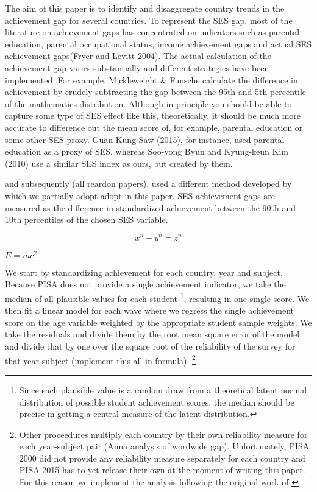 \documentclass[11pt, a4paper]{article}\usepackage[]{graphicx}\usepackage[]{color}
\begin{document}
The aim of this paper is to identify and disaggregate country trends in the achievement gap for several countries. To represent the SES gap, most of the literature on achievement gaps has concentrated on indicators such as parental education, parental occupational status, income achievement gaps and actual SES achievement gaps(Fryer and Levitt 2004). The actual calculation of the achievement gap varies substantially and different strategies have been implemented. For example, Mickleweight \& Funsche calculate the difference in achievement by crudely subtracting the gap between the 95th and 5th percentile of the mathematics distribution. Although in principle you should be able to capture some type of SES effect like this, theoretically, it should be much more accurate to difference out the mean score of, for example, parental education or some other SES proxy. Guan Kung Saw (2015), for instance, used parental education as a proxy of SES, whereas Soo-yong Byun and Kyung-keun Kim (2010) use a similar SES index as ours, but created by them.

\citet{reardon2011} and subsequently (all reardon papers), used a different method developed by \citet{reardon2011} which we partially adopt adopt in this paper. SES achievement gaps are measured as the difference in standardized achievement between the 90th and 10th percentiles of the chosen SES variable.


\[ x^n + y^n = z^n \]

\begin{math}
E=mc^2
\end{math}

We start by standardizing achievement for each country, year and subject. Because PISA does not provide a single achievement indicator, we take the median of all plausible values for each student \footnote{Since each plausible value is a random draw from a theoretical latent normal distribution of possible student achievement scores, the median should be precise in getting a central measure of the latent distribution.}, resulting in one single score. We then fit a linear model for each wave where we regress the single achievement score on the age variable weighted by the appropriate student sample weights. We take the residuals and divide them by the root mean square error of the model and divide that by one over the square root of the reliability of the survey for that year-subject (implement this all in formula). \footnote{Other proceedures multiply each country by their own reliability measure for each year-subject pair (Anna analysis of wordwide gap). Unfortunately, PISA 2000 did not provide any reliability measure separately for each country and PISA 2015 has to yet release their own at the moment of writing this paper. For this reason we implement the analysis following the original work of \citet{reardon2011}}
\end{document}
